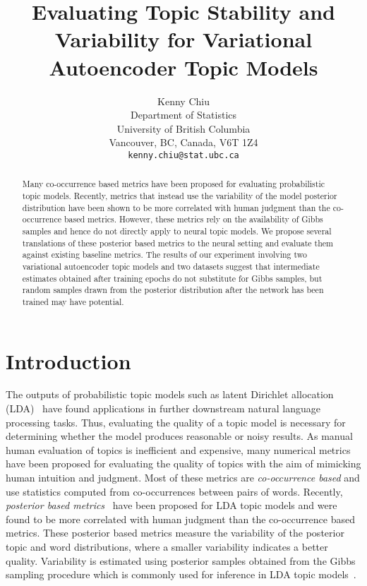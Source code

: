 \documentclass[10pt]{article}
\title{Evaluating Topic Stability and Variability for Variational Autoencoder Topic Models}
\author{
Kenny Chiu \\
Department of Statistics \\
University of British Columbia \\
Vancouver, BC, Canada, V6T 1Z4 \\
{\tt kenny.chiu@stat.ubc.ca}
}
\begin{document}
\maketitle
\begin{abstract}
Many co-occurrence based metrics have been proposed for evaluating probabilistic topic models. Recently, metrics that instead use the variability of the model posterior distribution have been shown to be more correlated with human judgment than the co-occurrence based metrics. However, these metrics rely on the availability of Gibbs samples and hence do not directly apply to neural topic models. We propose several translations of these posterior based metrics to the neural setting and evaluate them against existing baseline metrics. The results of our experiment involving two variational autoencoder topic models and two datasets suggest that intermediate estimates obtained after training epochs do not substitute for Gibbs samples, but random samples drawn from the posterior distribution after the network has been trained may have potential.
\end{abstract}

\section{Introduction}

The outputs of probabilistic topic models such as latent Dirichlet allocation (LDA)~\cite{Blei:2003} have found applications in further downstream natural language processing tasks. Thus, evaluating the quality of a topic model is necessary for determining whether the model produces reasonable or noisy results. As manual human evaluation of topics is inefficient and expensive, many numerical metrics have been proposed for evaluating the quality of topics with the aim of mimicking human intuition and judgment. Most of these metrics are \textit{co-occurrence based} and use statistics computed from co-occurrences between pairs of words. Recently, \textit{posterior based metrics}~\cite{Xing:2018,Xing:2019} have been proposed for LDA topic models and were found to be more correlated with human judgment than the co-occurrence based metrics. These posterior based metrics measure the variability of the posterior topic and word distributions, where a smaller variability indicates a better quality. Variability is estimated using posterior samples obtained from the Gibbs sampling procedure which is commonly used for inference in LDA topic models~\cite{Steyvers:2007}.
\end{document}
